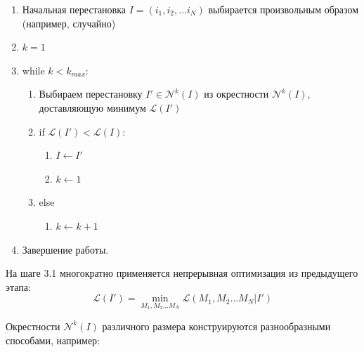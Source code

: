 \documentclass[10pt]{SPIIRAS_Proceedings}
\begin{document}
\begin{enumerate}[label*=\arabic*.]
  \item Начальная перестановка
  $I = (i_1, i_2, ... i_N)$
  выбирается произвольным образом
  (например, случайно)
  \item $k=1$
  \item while $k < k_{max}$:
  \begin{enumerate}
    [label*=\arabic*.]
    \item Выбираем перестановку $I' \in \mathcal N^k(I)$
    из окрестности
    $\mathcal N^k(I)$,
    доставляющую минимум
    $\mathcal L(I')$
    \item if $\mathcal L(I')< \mathcal L(I)$:
    \begin{enumerate}[label*=\arabic*.]
      \item $I \gets I'$
      \item $k \gets 1$
    \end{enumerate}
    \item else
    \begin{enumerate}[label*=\arabic*.]
      \item $k \gets k+1$
    \end{enumerate}
  \end{enumerate}
  \item Завершение работы.
\end{enumerate}

На шаге 3.1
многократно применяется
непрерывная оптимизация из предыдущего этапа:
$$
\mathcal L (I') = \min_{M_1, M_2 \dots M_N}
  \mathcal L (M_1, M_2 \dots M_N | I')
$$

Окрестности
$\mathcal N^k(I)$
различного размера
конструируются разнообразными способами,
например:
\end{document}
